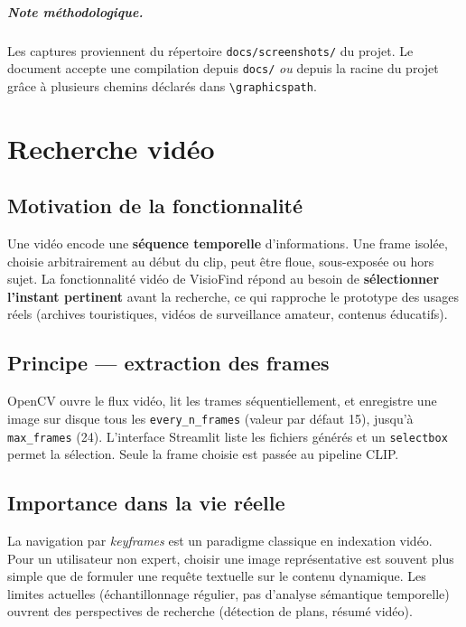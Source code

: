 \documentclass[11pt,a4paper,openany]{report}
\begin{document}
\paragraph{Note méthodologique.} Les captures proviennent du répertoire \texttt{docs/screenshots/} du projet. Le document accepte une compilation depuis \texttt{docs/} \emph{ou} depuis la racine du projet grâce à plusieurs chemins déclarés dans \texttt{\textbackslash graphicspath}.

\chapter{Recherche vidéo}

\section{Motivation de la fonctionnalité}

Une vidéo encode une \textbf{séquence temporelle} d'informations. Une frame isolée, choisie arbitrairement au début du clip, peut être floue, sous-exposée ou hors sujet. La fonctionnalité vidéo de VisioFind répond au besoin de \textbf{sélectionner l'instant pertinent} avant la recherche, ce qui rapproche le prototype des usages réels (archives touristiques, vidéos de surveillance amateur, contenus éducatifs).

\section{Principe — extraction des frames}

OpenCV ouvre le flux vidéo, lit les trames séquentiellement, et enregistre une image sur disque tous les \texttt{every\_n\_frames} (valeur par défaut 15), jusqu'à \texttt{max\_frames} (24). L'interface Streamlit liste les fichiers générés et un \texttt{selectbox} permet la sélection. Seule la frame choisie est passée au pipeline CLIP.

\section{Importance dans la vie réelle}

La navigation par \emph{keyframes} est un paradigme classique en indexation vidéo. Pour un utilisateur non expert, choisir une image représentative est souvent plus simple que de formuler une requête textuelle sur le contenu dynamique. Les limites actuelles (échantillonnage régulier, pas d'analyse sémantique temporelle) ouvrent des perspectives de recherche (détection de plans, résumé vidéo).
\end{document}
